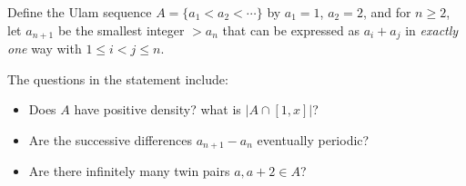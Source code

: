 Define the Ulam sequence $A=\{a_1<a_2<\cdots\}$ by $a_1=1$, $a_2=2$, and for $n\ge 2$, let $a_{n+1}$ be the smallest integer $>a_n$ that can be expressed as $a_i+a_j$ in \emph{exactly one} way with $1\le i<j\le n$.

The questions in the statement include:
\begin{itemize}
\item Does $A$ have positive density? what is $|A\cap[1,x]|$?
\item Are the successive differences $a_{n+1}-a_n$ eventually periodic?
\item Are there infinitely many twin pairs $a, a+2\in A$?
\end{itemize}
